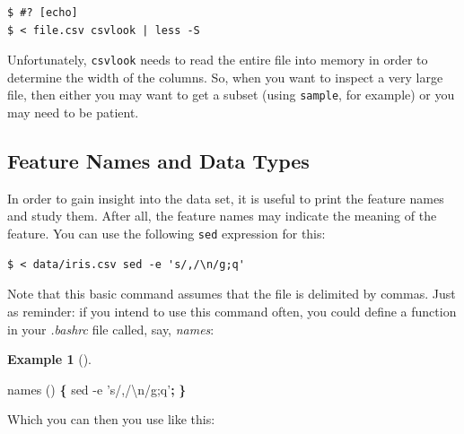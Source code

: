 \documentclass[
]{book}
\newenvironment{Shaded}{\begin{snugshade}}{\end{snugshade}}
\newcommand{\FunctionTok}[1]{\textcolor[rgb]{0.00,0.00,0.00}{#1}}
\newcommand{\KeywordTok}[1]{\textcolor[rgb]{0.13,0.29,0.53}{\textbf{#1}}}
\newcommand{\NormalTok}[1]{#1}
\newcommand{\StringTok}[1]{\textcolor[rgb]{0.31,0.60,0.02}{#1}}
\theoremstyle{definition}
\theoremstyle{definition}
\newtheorem{example}{Example}[chapter]
\theoremstyle{definition}
\theoremstyle{remark}
\begin{document}
\begin{verbatim}
$ #? [echo]
$ < file.csv csvlook | less -S
\end{verbatim}

Unfortunately, \texttt{csvlook} needs to read the entire file into memory in order to determine the width of the columns. So, when you want to inspect a very large file, then either you may want to get a subset (using \texttt{sample}, for example) or you may need to be patient.

\hypertarget{feature-names-and-data-types}{%
\subsection{Feature Names and Data Types}\label{feature-names-and-data-types}}

In order to gain insight into the data set, it is useful to print the feature names and study them. After all, the feature names may indicate the meaning of the feature. You can use the following \texttt{sed} expression for this:

\begin{verbatim}
$ < data/iris.csv sed -e 's/,/\n/g;q'
\end{verbatim}

Note that this basic command assumes that the file is delimited by commas. Just as reminder: if you intend to use this command often, you could define a function in your \emph{.bashrc} file called, say, \emph{names}:

\begin{example}[]
\protect\hypertarget{exm:unnamed-chunk-1}{}{\label{exm:unnamed-chunk-1} {} }
\end{example}

\begin{Shaded}
\begin{Highlighting}[]
\FunctionTok{names ()} \KeywordTok{\{} \FunctionTok{sed}\NormalTok{ -e }\StringTok{'s/,/\textbackslash{}n/g;q'}\KeywordTok{;} \KeywordTok{\}}
\end{Highlighting}
\end{Shaded}

Which you can then you use like this:
\end{document}

